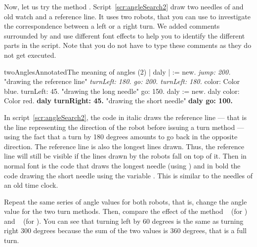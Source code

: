Now, let us try the method \turnRight. Script~\ref{scr:angleSearch2} draw two needles of and old watch and a reference line. It uses two robots, that you can use to investigate the correspondence between a left or a right turn.  We added comments surrounded by  and use different font effects to help you to identify the different parts in the script. Note that you do not have to type these comments as they do not get executed. 


\begin{scriptfig}{twoAnglesAnnotated}{The meaning of angles (2)} \label{scr:angleSearch2}
| \caro daly |
\caro := \Turtle new.
\emph{\caro jump: 200.}                        "drawing the reference line"
\emph{\caro turnLeft: 180.
\caro go: 200.
\caro turnLeft: 180.}
\caro color: Color blue.
\caro turnLeft: 45.                 "drawing the long needle"
\caro go: 150.
daly := \Turtle new.
daly color: Color red.
\textbf{daly turnRight: 45.}              "drawing the short needle"
\textbf{daly go: 100.}                             
\end{scriptfig}

In script~\ref{scr:angleSearch2}, the code in italic draws the reference line --- that is the line representing the direction of the robot before issuing a turn method
--- using the fact that a turn by 180 degrees amounts to go back in the
opposite direction. The reference line is also the  longest lines drawn. Thus, 
the reference line will still be visible if the lines drawn by the robots fall on top of it. 
Then in normal font is the code that draws the longest needle (using \caro) and in bold the code drawing the short needle using the variable . This is similar to the needles of an old time clock.


\begin{exonofig} Repeat the same series of angle values for both
 robots, that is, change the angle value for the two turn methods.
Then, compare the effect of the method \turnLeft\  (for
\caro) and \turnRight\  (for {}). You can see
that turning left by 60 degrees is the same as turning right 300
degrees because the sum of the two values is 360 degrees, that is a
full turn.
\end{exonofig}

